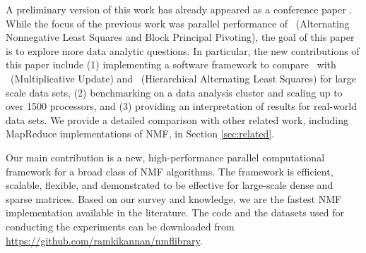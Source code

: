 

A preliminary version of this work has already appeared as a conference paper \cite{KBP16}.
While the focus of the previous work was parallel performance of \BPP\ (Alternating Nonnegative Least Squares and Block Principal Pivoting), the goal of this paper is to explore more data analytic questions.
In particular, the new contributions of this paper include (1) implementing a software framework to compare \BPP\ with \MU\ (Multiplicative Update) and \HALS\ (Hierarchical Alternating Least Squares) for large scale data sets, (2) benchmarking on a data analysis cluster and scaling up to over 1500 processors, and (3) providing an interpretation of results for real-world data sets.
We provide a detailed comparison with other related work, including MapReduce implementations of NMF, in Section \ref{sec:related}.

Our main contribution is a new, high-performance parallel computational framework for a broad class of NMF algorithms. 
The framework is efficient, scalable, flexible, and demonstrated to be effective for large-scale dense and sparse matrices.  
Based on our survey and knowledge, we are the fastest NMF implementation available in the literature.  
The code and the datasets used for conducting the experiments can be downloaded from \url{https://github.com/ramkikannan/nmflibrary}. 